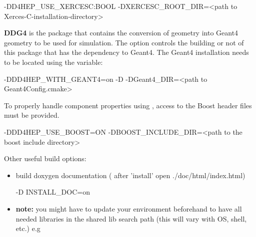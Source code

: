 \documentclass[10pt,a4paper]{article}
\begin{document}
\begin{unnumberedcode}
    -DD4HEP_USE_XERCESC:BOOL
    -DXERCESC_ROOT_DIR=<path to Xerces-C-installation-directory>
\end{unnumberedcode}

\noindent
{\bf{DDG4}} is the package that contains the conversion of \DDhep geometry 
into Geant4 geometry to be used for simulation. 
The option  controls the building or not of 
this package that has the dependency to Geant4. The Geant4 installation 
needs to be located using the variable:

\begin{unnumberedcode}
   -DDD4HEP_WITH_GEANT4=on -D 
   -DGeant4_DIR=<path to Geant4Config.cmake>
\end{unnumberedcode}

\noindent
To properly handle component properties using , 
access to the Boost header files must be provided.
\vspace{0.3cm}
\begin{unnumberedcode}
    -DDD4HEP_USE_BOOST=ON 
    -DBOOST_INCLUDE_DIR=<path to the boost include directory>
\end{unnumberedcode}

\noindent
Other useful build options:
\begin{itemize}
\item build doxygen documentation ( after 'install' open ./doc/html/index.html)
\begin{unnumberedcode}
    -D INSTALL_DOC=on 
\end{unnumberedcode}
 
\item {\bf{note:}} you might have to update your environment beforehand to have all needed 
     libraries in the shared lib search path (this will vary with OS, shell, etc.) e.g 
\end{itemize}

\end{document}
